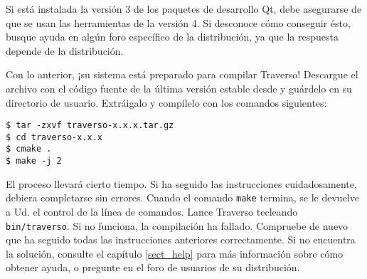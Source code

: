 Si está instalada la versión 3 de los paquetes de desarrollo Qt, debe asegurarse de que se usan las herramientas de la versión 4. Si desconoce cómo conseguir ésto, busque ayuda en algún foro específico de la distribución, ya que la respuesta depende de la distribución.

Con lo anterior, ¡su sistema está preparado para compilar Traverso! Descargue el archivo con el código fuente de la última versión estable desde \cite{trav-hp} y guárdelo en su directorio de usuario. Extráigalo y compílelo con los comandos siguientes:

\begin{verbatim}
$ tar -zxvf traverso-x.x.x.tar.gz
$ cd traverso-x.x.x
$ cmake .
$ make -j 2
\end{verbatim}

El proceso llevará cierto tiempo. Si ha seguido las instrucciones cuidadosamente, debiera completarse sin errores. Cuando el comando \texttt{make} termina, se le devuelve a Ud. el control de la línea de comandos. Lance Traverso tecleando \texttt{bin/traverso}. Si no funciona, la compilación ha fallado. Compruebe de nuevo que ha seguido todas las instrucciones anteriores correctamente. Si no encuentra la solución, consulte el capítulo \ref{sect_help} para más información sobre cómo obtener ayuda, o pregunte en el foro de usuarios de su distribución.

